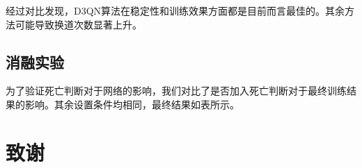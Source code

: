 \documentclass[letterpaper, 10 pt, conference]{ieeeconf}  %
\begin{document}
经过对比发现，D3QN算法在稳定性和训练效果方面都是目前而言最佳的。其余方法可能导致换道次数显著上升。
\subsection[]{消融实验}
为了验证死亡判断对于网络的影响，我们对比了是否加入死亡判断对于最终训练结果的影响。其余设置条件均相同，最终结果如表所示。



\addtolength{\textheight}{-1cm}   %









\section*{致谢}







\end{document}
